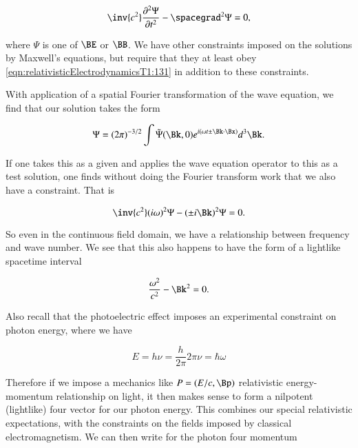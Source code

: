 \begin{equation}\label{eqn:relativisticElectrodynamicsT1:131}
\inv{c^2} \frac{\partial^2 \Psi}{\partial t^2} - \spacegrad^2 \Psi = 0,
\end{equation}

where $\Psi$ is one of $\BE$ or $\BB$.  We have other constraints imposed on the solutions by Maxwell's equations, but require that they at least obey \ref{eqn:relativisticElectrodynamicsT1:131} in addition to these constraints.

With application of a spatial Fourier transformation of the wave equation, we find that our solution takes the form

\begin{equation}\label{eqn:relativisticElectrodynamicsT1:132}
\Psi = (2 \pi)^{-3/2} \int \tilde{\Psi}(\Bk, 0) e^{i (\omega t \pm \Bk \cdot \Bx) } d^3 \Bk.
\end{equation}

If one takes this as a given and applies the wave equation operator to this as a test solution, one finds without doing the Fourier transform work that we also have a constraint.  That is

\begin{equation}\label{eqn:relativisticElectrodynamicsT1:133}
\inv{c^2} (i \omega)^2 \Psi - (\pm i \Bk)^2 \Psi = 0.
\end{equation}

So even in the continuous field domain, we have a relationship between frequency and wave number.  We see that this also happens to have the form of a lightlike spacetime interval

\begin{equation}\label{eqn:relativisticElectrodynamicsT1:134}
\frac{\omega^2}{c^2} - \Bk^2 = 0.
\end{equation}

Also recall that the photoelectric effect imposes an experimental constraint on photon energy, where we have

\begin{equation}\label{eqn:relativisticElectrodynamicsT1:135}
E = h \nu = \frac{h}{2\pi} 2 \pi \nu = \hbar \omega
\end{equation}

Therefore if we impose a mechanics like $P = (E/c, \Bp)$ relativistic energy-momentum relationship on light, it then makes sense to form a nilpotent (lightlike) four vector for our photon energy.  This combines our special relativistic expectations, with the constraints on the fields imposed by classical electromagnetism.  We can then write for the photon four momentum

